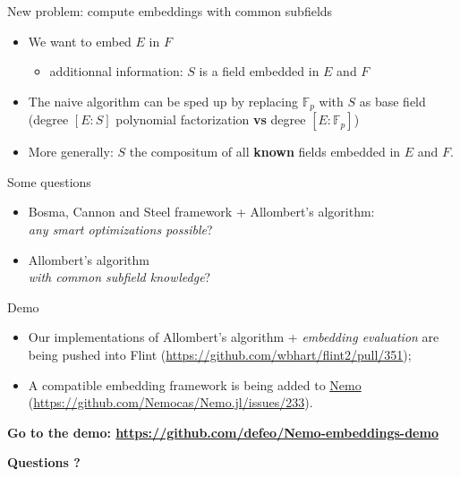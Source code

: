 \documentclass[francais]{beamer}
\def\F {\ensuremath{\mathbb{F}}}
\begin{document}
\begin{frame}{New problem: compute embeddings with common subfields}
  \begin{itemize}
    \item We want to embed $E$ in $F$
      \begin{itemize}
        \item additionnal information: $S$ is a field embedded in $E$ and $F$
      \end{itemize}
    \item The naive algorithm can be sped up by replacing $\F_p$ with
      $S$ as base field\\
      (degree $[E:S]$ polynomial factorization \textbf{vs} degree
      $[E:\mathbb{F}_p]$)
    \item More generally: $S$ the compositum of all \textbf{known}
      fields embedded in $E$ and $F$.
  \end{itemize}
\end{frame}

\begin{frame}{Some questions}
  \begin{itemize}
  \item Bosma, Cannon and Steel framework + Allombert's algorithm:\\
    \emph{any smart optimizations possible}?
  \item Allombert's algorithm\\ \emph{with common subfield knowledge}?
  \end{itemize}
\end{frame}

\begin{frame}{Demo}
  \begin{itemize}
  \item Our implementations of Allombert's algorithm + \emph{embedding
      evaluation} are being pushed into Flint
    (\url{https://github.com/wbhart/flint2/pull/351});
  \item A compatible embedding framework is being added to
    \href{http://nemocas.org/}{Nemo}
    (\url{https://github.com/Nemocas/Nemo.jl/issues/233}).
  \end{itemize}

  \bigskip
  
  \centering\large\bf
  Go to the demo: \url{https://github.com/defeo/Nemo-embeddings-demo}
\end{frame}

\begin{frame}
\Huge \textbf{Questions ?}
\end{frame}

\begin{frame}[allowframebreaks]\frametitle{\refname}
  \scriptsize
    
    
\end{frame}
\end{document}
